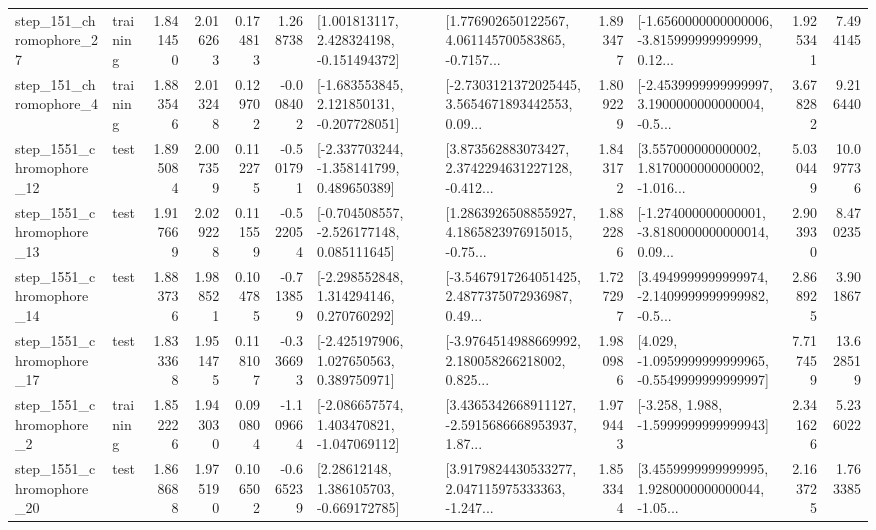 \begin{tabular}{llrrrrllrlrr}
  step\_151\_chromophore\_27 &  training &      1.841450 &    2.016263 &      0.174813 &  1.268738 &    [1.001813117, 2.428324198, -0.151494372] &  [1.776902650122567, 4.061145700583865, -0.7157... &       1.893477 &  [-1.6560000000000006, -3.815999999999999, 0.12... &            1.925341 &          7.494145 \\
   step\_151\_chromophore\_4 &  training &      1.883546 &    2.013248 &      0.129702 & -0.008402 &   [-1.683553845, 2.121850131, -0.207728051] &  [-2.7303121372025445, 3.5654671893442553, 0.09... &       1.809229 &  [-2.4539999999999997, 3.1900000000000004, -0.5... &            3.678282 &          9.216440 \\
 step\_1551\_chromophore\_12 &      test &      1.895084 &    2.007359 &      0.112275 & -0.501791 &   [-2.337703244, -1.358141799, 0.489650389] &  [3.873562883073427, 2.3742294631227128, -0.412... &       1.843172 &  [3.557000000000002, 1.8170000000000002, -1.016... &            5.030449 &         10.097736 \\
 step\_1551\_chromophore\_13 &      test &      1.917669 &    2.029228 &      0.111559 & -0.522054 &   [-0.704508557, -2.526177148, 0.085111645] &  [1.2863926508855927, 4.1865823976915015, -0.75... &       1.882286 &  [-1.274000000000001, -3.8180000000000014, 0.09... &            2.903930 &          8.470235 \\
 step\_1551\_chromophore\_14 &      test &      1.883736 &    1.988521 &      0.104785 & -0.713859 &    [-2.298552848, 1.314294146, 0.270760292] &  [-3.5467917264051425, 2.4877375072936987, 0.49... &       1.727297 &  [3.4949999999999974, -2.1409999999999982, -0.5... &            2.868925 &          3.901867 \\
 step\_1551\_chromophore\_17 &      test &      1.833368 &    1.951475 &      0.118107 & -0.336693 &    [-2.425197906, 1.027650563, 0.389750971] &  [-3.9764514988669992, 2.180058266218002, 0.825... &       1.980986 &  [4.029, -1.0959999999999965, -0.5549999999999997] &            7.717459 &         13.628519 \\
  step\_1551\_chromophore\_2 &  training &      1.852226 &    1.943030 &      0.090804 & -1.109664 &   [-2.086657574, 1.403470821, -1.047069112] &  [3.4365342668911127, -2.5915686668953937, 1.87... &       1.979443 &               [-3.258, 1.988, -1.5999999999999943] &            2.341626 &          5.236022 \\
 step\_1551\_chromophore\_20 &      test &      1.868688 &    1.975190 &      0.106502 & -0.665239 &     [2.28612148, 1.386105703, -0.669172785] &  [3.9179824430533277, 2.047115975333363, -1.247... &       1.853344 &  [3.4559999999999995, 1.9280000000000044, -1.05... &            2.163725 &          1.763385 \\

\end{tabular}
